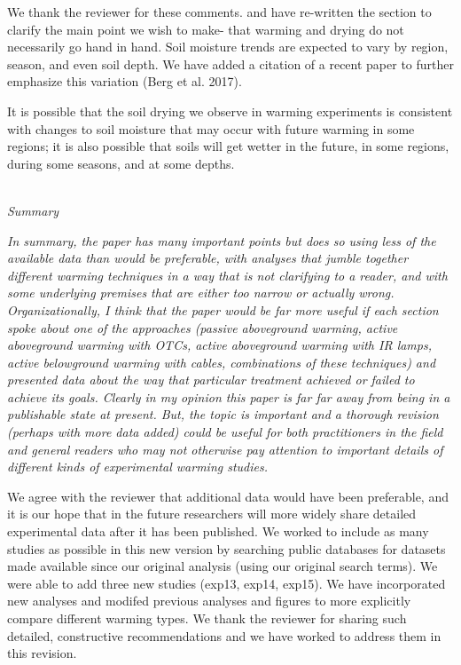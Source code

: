 \documentclass[11pt,a4paper]{letter}
\begin{document}
\begin{letter}{}
\par We thank the reviewer for these comments. and have re-written the section to clarify the main point we wish to make- that warming and drying do not necessarily go hand in hand. Soil moisture trends are expected to vary by region, season, and even soil depth. We have added a citation of a recent paper to further emphasize this variation (Berg et al. 2017). 
\par It is possible that the soil drying we observe in warming experiments is consistent with changes to soil moisture that may occur with future warming in some regions; it is also possible that soils will get wetter in the future, in some regions, during some seasons, and at some depths. 

\\
\emph{Summary}

\emph{In summary, the paper has many important points but does so using less of the available data
than would be preferable, with analyses that jumble together different warming techniques in a
way that is not clarifying to a reader, and with some underlying premises that are either too
narrow or actually wrong. Organizationally, I think that the paper would be far more useful if
each section spoke about one of the approaches (passive aboveground warming, active
aboveground warming with OTCs, active aboveground warming with IR lamps, active
belowground warming with cables, combinations of these techniques) and presented data
about the way that particular treatment achieved or failed to achieve its goals. Clearly in my
opinion this paper is far far away from being in a publishable state at present. But, the topic is
important and a thorough revision (perhaps with more data added) could be useful for both
practitioners in the field and general readers who may not otherwise pay attention to
important details of different kinds of experimental warming studies.}

\par We agree with the reviewer that additional data would have been preferable, and it is our hope that in the future researchers will more widely share detailed experimental data after it has been published. We worked to include as many studies as possible in this new version by searching public databases for datasets made available since our original analysis (using our original search terms). We were able to add three new studies (exp13, exp14, exp15). We have incorporated new analyses and modifed previous analyses and figures to more explicitly compare different warming types. We thank the reviewer for sharing such detailed, constructive recommendations and we have worked to address them in this revision.



\end{letter}
\end{document}
